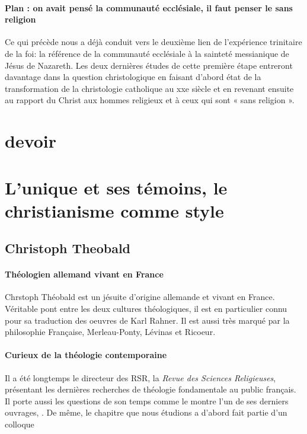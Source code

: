 \paragraph{Plan : on avait pensé la communauté ecclésiale, il faut penser le sans religion}
Ce qui précède nous a déjà conduit vers le deuxième lien de l'expérience trinitaire de la foi: la référence de la communauté ecclésiale à la sainteté messianique de Jésus de Nazareth.
Les deux dernières études de cette première étape entreront davantage dans la question christologique en faisant d'abord état de la transformation de la christologie catholique au xxe siècle et en revenant ensuite au rapport du Christ aux hommes religieux et à ceux qui sont « sans religion ».

 
\section{devoir}

\section{L'unique et ses témoins, le christianisme comme style}

\subsection{Christoph Theobald}

\paragraph{Théologien allemand vivant en France} Chrstoph Théobald est un jésuite d'origine allemande et vivant en France. Véritable pont entre les deux cultures théologiques, il est en particulier connu pour sa traduction des oeuvres de Karl Rahner. Il est aussi très marqué par la philosophie Française, Merleau-Ponty, Lévinas et Ricoeur.

\paragraph{Curieux de la théologie contemporaine} Il a été longtemps le directeur des RSR, la \textit{Revue des Sciences Religieuses}, présentant les dernières recherches de théologie fondamentale au public français. Il porte aussi les questions de son temps comme le montre l'un de ses derniers ouvrages, \cite{theobald_urgences_2017}. De même, le chapitre que nous étudions a d'abord fait partie d'un colloque \cite{centre_sevres_paris_unique_1996}


